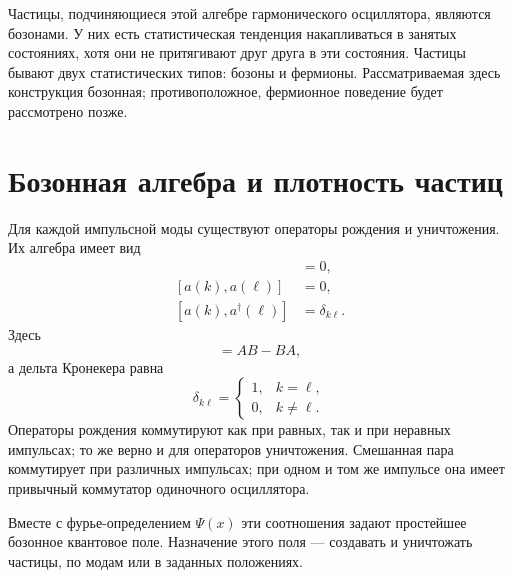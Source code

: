 Частицы, подчиняющиеся этой алгебре гармонического осциллятора, являются бозонами. У них есть статистическая тенденция накапливаться в занятых состояниях, хотя они не притягивают друг друга в эти состояния. Частицы бывают двух статистических типов: бозоны и фермионы. Рассматриваемая здесь конструкция бозонная; противоположное, фермионное поведение будет рассмотрено позже.

\section{Бозонная алгебра и плотность частиц}

Для каждой импульсной моды существуют операторы рождения и уничтожения. Их алгебра имеет вид
\begin{align}
[a^\dagger(k),a^\dagger(\ell)]&=0,\\
[a(k),a(\ell)]&=0,\\
[a(k),a^\dagger(\ell)]&=\delta_{k\ell}.
\end{align}
Здесь
\begin{equation}
[A,B]=AB-BA,
\end{equation}
а дельта Кронекера равна
\begin{equation}
\delta_{k\ell}=
\begin{cases}
1,&k=\ell,\\
0,&k\ne\ell.
\end{cases}
\end{equation}
Операторы рождения коммутируют как при равных, так и при неравных импульсах; то же верно и для операторов уничтожения. Смешанная пара коммутирует при различных импульсах; при одном и том же импульсе она имеет привычный коммутатор одиночного осциллятора.

Вместе с фурье-определением \(\Psi(x)\) эти соотношения задают простейшее бозонное квантовое поле. Назначение этого поля — создавать и уничтожать частицы, по модам или в заданных положениях.


